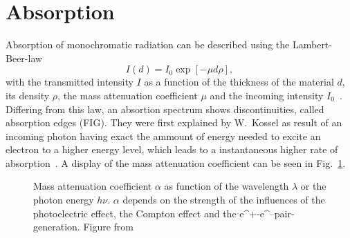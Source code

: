  
\section{Absorption}\label{sec:Q3}
Absorption of monochromatic radiation can be described using the Lambert-Beer-law
\begin{equation}
    I(d) = I_0 \exp[-\mu d\rho],
\end{equation}
with the transmitted intensity $I$ as a function of the thickness of the material $d$, its density $\rho$, the mass attenuation coefficient $\mu$ and the incoming intensity $I_0$~\cite{Bohm.2021}. Differing from this law, an absortion spectrum shows discontinuities, called absorption edges (FIG). They were first explained by W.~Kossel as result of an incoming photon having exact the ammount of energy needed to excite an electron to a higher energy level, which leads to a instantaneous higher rate of absorption~\cite{Kossel.1920}. A display of the mass attenuation coefficient can be seen in Fig.~\ref{fig:muAbs}.

\begin{figure}[ht]
    \centering
    
    \caption[]{Mass attenuation coefficient $\alpha$ as function of the wavelength $\lambda$ or the photon energy $h\nu$. $\alpha$ depends on the strength of the influences of the photoelectric effect, the Compton effect and the e^+-e^--pair-generation. Figure from \cite[]{Demtroeder.2016}}
    \label{fig:muAbs}
\end{figure}